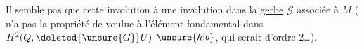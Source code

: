 Il  semble pas que cette involution  à une involution dans la \uline{gerbe} $\mathscr G$ associée à $M$ (   n'a pas la propriété de  voulue  à l'élément fondamental  dans $H^2(Q,\deleted{\unsure{G}}U)$ $\unsure{h|b}$, qui serait  d'ordre  $2$\ldots).
